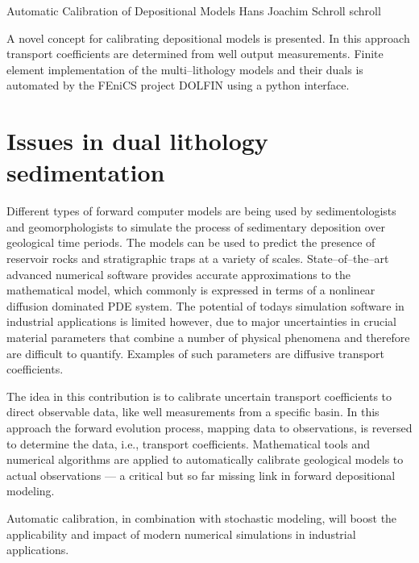               {Automatic Calibration of Depositional Models}
              {Hans Joachim Schroll}
              {schroll}

A novel concept for calibrating depositional models is presented.
In this approach transport coefficients are determined from well output measurements.
Finite element implementation of the multi--lithology models and their duals is automated
by the FEniCS project DOLFIN using a python interface.


\section{Issues in dual lithology sedimentation}

Different types of forward computer models are being used by sedimentologists and geomorphologists
to simulate the process of sedimentary deposition over geological time periods.
The models can be used to predict the presence of reservoir rocks and stratigraphic traps at a variety of scales.
State--of--the--art advanced numerical software provides accurate approximations to the mathematical model,
which commonly is expressed in terms of a nonlinear diffusion dominated PDE system.
The potential of todays simulation software in industrial applications is limited however,
due to major uncertainties in crucial material parameters that combine a number of physical phenomena
and therefore are difficult to quantify.
Examples of such parameters are diffusive transport coefficients.

The idea in this contribution is to calibrate uncertain transport coefficients to direct observable data,
like well measurements from a specific basin.
In this approach the forward evolution process, mapping data to observations,
is reversed to determine the data, i.e., transport coefficients.
Mathematical tools and numerical algorithms are applied
to automatically calibrate geological models to actual observations ---
a critical but so far missing link in forward depositional modeling.

Automatic calibration, in combination with stochastic modeling,
will boost the applicability and impact of modern numerical simulations in industrial applications.

